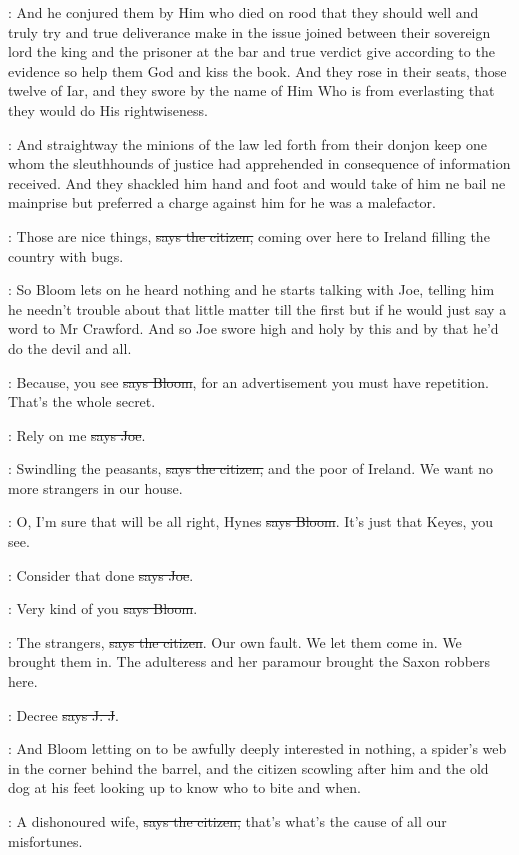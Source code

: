 :
And he conjured them by Him who died on rood that
they should well and truly try and true deliverance make in the
issue joined between their sovereign lord the king and the prisoner at
the bar and true verdict give according to the evidence so help them God
and kiss the book. And they rose in their seats, those twelve of Iar, and
they swore by the name of Him Who is from everlasting that they would do
His rightwiseness.

:
And straightway the minions of the law led forth from
their donjon keep one whom the sleuthhounds of justice had apprehended in
consequence of information received. And they shackled him hand and foot
and would take of him ne bail ne mainprise but preferred a charge against
him for he was a malefactor.

\citizen:
Those are nice things, \sout{says the citizen,}
coming over here to Ireland filling the country with bugs.

\Nq:
So Bloom lets on he heard nothing and he starts talking with Joe, telling
him he needn't trouble about that little matter till the first but if he
would just say a word to Mr Crawford. And so Joe swore high and holy by
this and by that he'd do the devil and all.

\Bloom:
Because, you see \sout{says Bloom},
for an advertisement you must have
repetition. That's the whole secret.

\joe:
Rely on me \sout{says Joe}.

\citizen:
Swindling the peasants, \sout{says the citizen,}
and the poor of Ireland. We
want no more strangers in our house.

\Bloom:
O, I'm sure that will be all right,
Hynes \sout{says Bloom}. It's just that
Keyes, you see.

\joe:
Consider that done \sout{says Joe}.

\Bloom:
Very kind of you \sout{says Bloom}.

\citizen:
The strangers, \sout{says the citizen}.
Our own fault. We let them come in. We
brought them in. The adulteress and her paramour brought the Saxon
robbers here.

\jjom:
Decree  \sout{says J. J}.

\Nq:
And Bloom letting on to be awfully deeply interested in nothing, a
spider's web in the corner behind the barrel, and the citizen scowling
after him and the old dog at his feet looking up to know who to bite and
when.

\citizen:
A dishonoured wife, \sout{says the citizen,}
that's what's the cause of all our
misfortunes.


